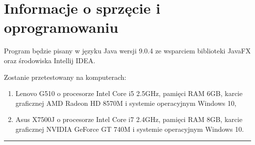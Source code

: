 \documentclass[a4paper,11pt]{article}
\newcommand{\linia}{\rule{\linewidth}{0.4mm}}
\begin{document}
\section{Informacje o sprzęcie i oprogramowaniu}
Program będzie pisany w języku Java wersji 9.0.4 ze wsparciem biblioteki JavaFX oraz środowiska Intellij IDEA.

Zostanie przetestowany na komputerach:
\begin{enumerate}
\item Lenovo G510 o procesorze Intel Core i5 2.5GHz, pamięci RAM 6GB, karcie graficznej AMD Radeon
HD 8570M i systemie operacyjnym Windows 10,
\item Asus X7500J o procesorze Intel Core i7 2.4GHz, pamięci RAM 8GB, karcie graficznej NVIDIA GeForce GT 740M i systemie operacyjnym Windows 10. 
\end{enumerate} 
\noindent\linia
\end{document}
